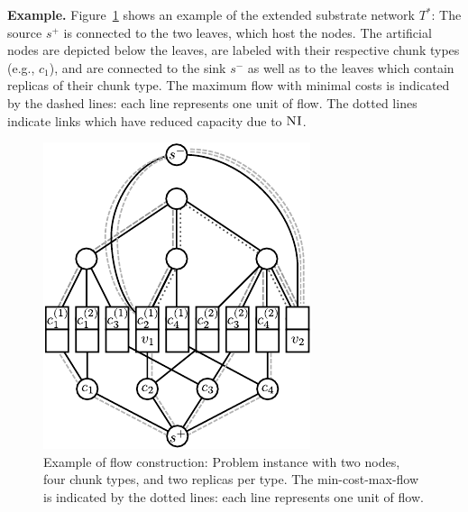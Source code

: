 \documentclass[9pt]{sigcomm-alternate}
\newcommand{\Source}{\ensuremath{s^{+}}}
\newcommand{\Sink}{\ensuremath{s^{-}}}
\newcommand{\achunk}{\ensuremath{c}}
\newcommand{\CC}{\textsc{NI}}
\newcommand{\Tree}{\ensuremath{T}}
\begin{document}
\textbf{Example.} Figure~\ref{fig:flow_construction} shows an example of the extended substrate
network $\Tree^*$: The source $\Source$ is connected to the two leaves, which host the
nodes. The artificial nodes are depicted below the leaves, are labeled with
their respective chunk types (e.g., $\achunk_1$), and are connected to the sink
$\Sink$ as well as to the leaves which contain replicas of their chunk type.
The
maximum flow with minimal costs is indicated by the dashed lines: each line
represents one unit of flow. The dotted lines indicate links which have reduced
capacity due to $\CC$.

\begin{figure}
\centering
\includegraphics[width=0.8\columnwidth]{figs/flow_ma_cv}
\caption{Example of flow construction: Problem instance with two nodes, four chunk
types, and two replicas per type. The min-cost-max-flow
is indicated by the dotted lines: each line represents one unit of flow.
}
\label{fig:flow_construction}
\end{figure}
\end{document}
